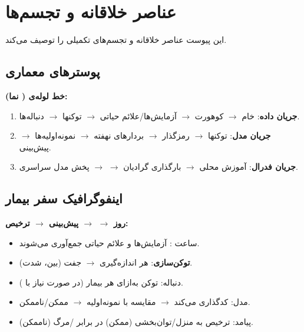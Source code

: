 \chapter{عناصر خلاقانه و تجسم‌ها}
\label{app:creative}

این پیوست عناصر خلاقانه و تجسم‌های تکمیلی را توصیف می‌کند.

\section{پوسترهای معماری}

\textbf{خط لوله‌ی  ( نما):}
\begin{enumerate}
\item \textbf{جریان داده}:  خام $\to$ کوهورت $\to$ آزمایش‌ها/علائم حیاتی $\to$ توکنها $\to$ دنباله‌ها.
\item \textbf{جریان مدل}: توکنها $\to$ رمزگذار  $\to$ بردارهای نهفته $\to$ نمونه‌اولیه‌ها $\to$ پیش‌بینی.
\item \textbf{جریان فدرال}: آموزش محلی $\to$ بارگذاری گرادیان $\to$  $\to$ پخش مدل سراسری.
\end{enumerate}

\section{اینفوگرافیک سفر بیمار}

\textbf{روز   $\to$  $\to$ پیش‌بینی $\to$ ترخیص:}
\begin{itemize}
\item ساعت : آزمایش‌ها و علائم حیاتی جمع‌آوری می‌شوند.
\item \textbf{توکن‌سازی}: هر اندازه‌گیری $\to$ جفت (بین، شدت).
\item دنباله:  توکن به‌ازای هر بیمار (در صورت نیاز با ).
\item مدل:  کدگذاری می‌کند $\to$ مقایسه با نمونه‌اولیه $\to$ ممکن/ناممکن.
\item پیامد: ترخیص به منزل/توان‌بخشی (ممکن) در برابر /مرگ (ناممکن).
\end{itemize}

